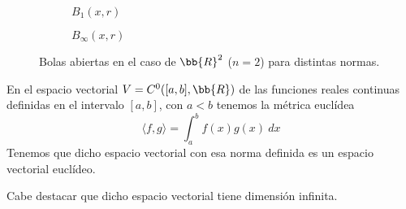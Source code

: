 \begin{figure}[H]
\begin{subfigure}[b]{0.3\textwidth}
        \caption{${B}_1(x,r)$}
    \end{subfigure}
    \hfill
    \begin{subfigure}[b]{0.3\textwidth}
        \centering
        \caption{${B}_\infty(x,r)$}
    \end{subfigure}
    \caption{Bolas abiertas en el caso de $\bb{R}^2$ ($n=2$) para distintas normas.}
\end{figure}

\begin{ejemplo}
    En el espacio vectorial $V=C^0([a,b], \bb{R})$ de las funciones reales continuas definidas en el intervalo $[a,b]$, con $a<b$ tenemos la métrica euclídea
    \begin{equation*}
        \langle f,g\rangle = \int_a^b f(x)g(x)~dx
    \end{equation*}
    Tenemos que dicho espacio vectorial con esa norma definida es un espacio vectorial euclídeo.
    
    Cabe destacar que dicho espacio vectorial tiene dimensión infinita.
\end{ejemplo}

